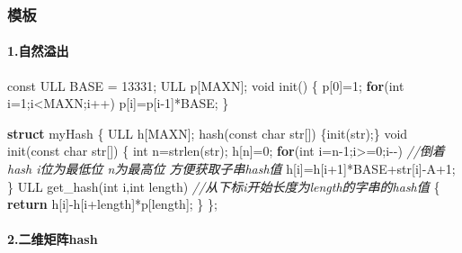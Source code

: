 \documentclass[
]{article}
\newenvironment{Shaded}{}{}
\newcommand{\AttributeTok}[1]{\textcolor[rgb]{0.49,0.56,0.16}{#1}}
\newcommand{\CharTok}[1]{\textcolor[rgb]{0.25,0.44,0.63}{#1}}
\newcommand{\CommentTok}[1]{\textcolor[rgb]{0.38,0.63,0.69}{\textit{#1}}}
\newcommand{\ControlFlowTok}[1]{\textcolor[rgb]{0.00,0.44,0.13}{\textbf{#1}}}
\newcommand{\DataTypeTok}[1]{\textcolor[rgb]{0.56,0.13,0.00}{#1}}
\newcommand{\DecValTok}[1]{\textcolor[rgb]{0.25,0.63,0.44}{#1}}
\newcommand{\KeywordTok}[1]{\textcolor[rgb]{0.00,0.44,0.13}{\textbf{#1}}}
\newcommand{\NormalTok}[1]{#1}
\begin{document}
\hypertarget{ux6a21ux677f-3}{%
\subsubsection{模板}\label{ux6a21ux677f-3}}

\hypertarget{ux81eaux7136ux6ea2ux51fa}{%
\paragraph{1.自然溢出}\label{ux81eaux7136ux6ea2ux51fa}}

\begin{Shaded}
\begin{Highlighting}[]
\AttributeTok{const}\NormalTok{ ULL BASE = }\DecValTok{13331}\NormalTok{;}
\NormalTok{ULL p[MAXN];}
\DataTypeTok{void}\NormalTok{ init()}
\NormalTok{\{}
\NormalTok{    p[}\DecValTok{0}\NormalTok{]=}\DecValTok{1}\NormalTok{;}
    \ControlFlowTok{for}\NormalTok{(}\DataTypeTok{int}\NormalTok{ i=}\DecValTok{1}\NormalTok{;i\textless{}MAXN;i++)}
\NormalTok{        p[i]=p[i{-}}\DecValTok{1}\NormalTok{]*BASE;}
\NormalTok{\}}

\KeywordTok{struct}\NormalTok{ myHash}
\NormalTok{\{}
\NormalTok{    ULL h[MAXN];}
\NormalTok{    hash(}\AttributeTok{const} \DataTypeTok{char}\NormalTok{ str[]) \{init(str);\}}
    \DataTypeTok{void}\NormalTok{ init(}\AttributeTok{const} \DataTypeTok{char}\NormalTok{ str[])}
\NormalTok{    \{}
        \DataTypeTok{int}\NormalTok{ n=strlen(str);}
\NormalTok{        h[n]=}\DecValTok{0}\NormalTok{;}
        \ControlFlowTok{for}\NormalTok{(}\DataTypeTok{int}\NormalTok{ i=n{-}}\DecValTok{1}\NormalTok{;i\textgreater{}=}\DecValTok{0}\NormalTok{;i{-}{-}) }\CommentTok{//倒着hash i位为最低位 n为最高位 方便获取子串hash值}
\NormalTok{            h[i]=h[i+}\DecValTok{1}\NormalTok{]*BASE+str[i]{-}}\CharTok{\textquotesingle{}A\textquotesingle{}}\NormalTok{+}\DecValTok{1}\NormalTok{;}
\NormalTok{    \}}
\NormalTok{    ULL get\_hash(}\DataTypeTok{int}\NormalTok{ i,}\DataTypeTok{int}\NormalTok{ length) }\CommentTok{//从下标i开始长度为length的字串的hash值}
\NormalTok{    \{}
        \ControlFlowTok{return}\NormalTok{ h[i]{-}h[i+length]*p[length];}
\NormalTok{    \}}
\NormalTok{\};}
\end{Highlighting}
\end{Shaded}

\hypertarget{ux4e8cux7ef4ux77e9ux9635hash}{%
\paragraph{2.二维矩阵hash}\label{ux4e8cux7ef4ux77e9ux9635hash}}
\end{document}
